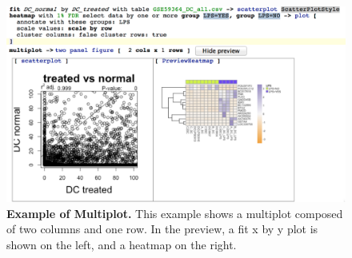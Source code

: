 \begin{figure}[h!tbp]
  \centering
  \includegraphics[width=\figWidthWide]{figures/MutliplotExample.png}
\caption[Example of Multiplot.]{\textbf{Example of Multiplot.} This example shows a multiplot composed of two columns and one row. In the preview,  a fit x by y plot is shown on the left, and a heatmap on the right. }
\label{fig:ExampleMultiplot}
\end{figure}

  
